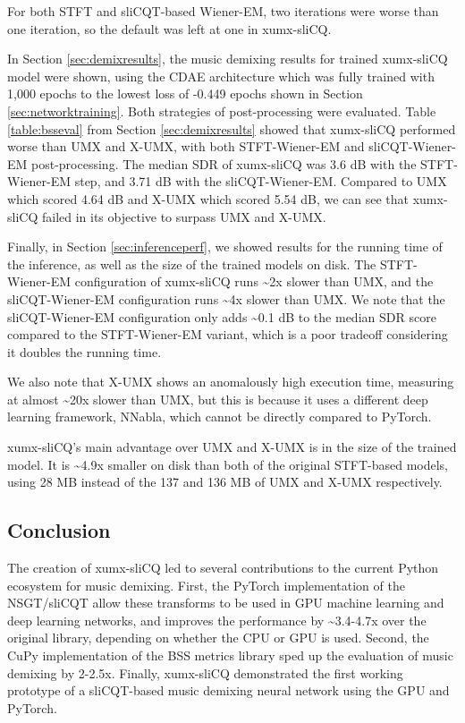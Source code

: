 \documentclass[report.tex]{subfiles}
\begin{document}
For both STFT and sliCQT-based Wiener-EM, two iterations were worse than one iteration, so the default was left at one in xumx-sliCQ.

In Section \ref{sec:demixresults}, the music demixing results for trained xumx-sliCQ model were shown, using the CDAE architecture which was fully trained with 1,000 epochs to the lowest loss of -0.449 epochs shown in Section \ref{sec:networktraining}. Both strategies of post-processing were evaluated. Table \ref{table:bsseval} from Section \ref{sec:demixresults} showed that xumx-sliCQ performed worse than UMX and X-UMX, with both STFT-Wiener-EM and sliCQT-Wiener-EM post-processing. The median SDR of xumx-sliCQ was 3.6 dB with the STFT-Wiener-EM step, and 3.71 dB with the sliCQT-Wiener-EM. Compared to UMX which scored 4.64 dB and X-UMX which scored 5.54 dB, we can see that xumx-sliCQ failed in its objective to surpass UMX and X-UMX.

Finally, in Section \ref{sec:inferenceperf}, we showed results for the running time of the inference, as well as the size of the trained models on disk. The STFT-Wiener-EM configuration of xumx-sliCQ runs \textasciitilde2x slower than UMX, and the sliCQT-Wiener-EM configuration runs \textasciitilde4x slower than UMX. We note that the sliCQT-Wiener-EM configuration only adds \textasciitilde0.1 dB to the median SDR score compared to the STFT-Wiener-EM variant, which is a poor tradeoff considering it doubles the running time.

We also note that X-UMX shows an anomalously high execution time, measuring at almost \textasciitilde20x slower than UMX, but this is because it uses a different deep learning framework, NNabla, which cannot be directly compared to PyTorch.

xumx-sliCQ's main advantage over UMX and X-UMX is in the size of the trained model. It is \textasciitilde4.9x smaller on disk than both of the original STFT-based models, using 28 MB instead of the 137 and 136 MB of UMX and X-UMX respectively.

\subsection{Conclusion}
\label{sec:conclusion}

The creation of xumx-sliCQ led to several contributions to the current Python ecosystem for music demixing. First, the PyTorch implementation of the NSGT/sliCQT allow these transforms to be used in GPU machine learning and deep learning networks, and improves the performance by \textasciitilde3.4-4.7x over the original library, depending on whether the CPU or GPU is used. Second, the CuPy implementation of the BSS metrics library sped up the evaluation of music demixing by 2-2.5x. Finally, xumx-sliCQ demonstrated the first working prototype of a sliCQT-based music demixing neural network using the GPU and PyTorch.
\end{document}
